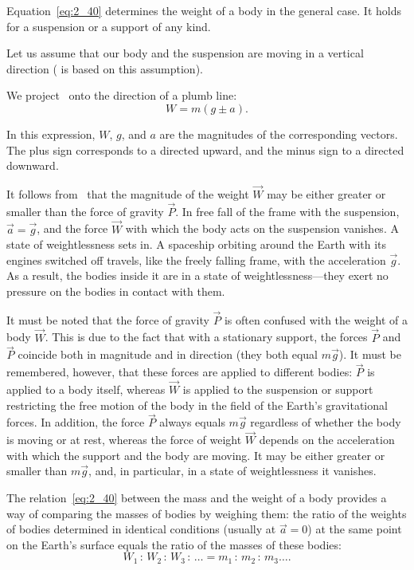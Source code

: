 \noindent
Equation~\eqref{eq:2_40} determines the weight of a body in the general case. It holds for a suspension or a support of any kind.

Let us assume that our body and the suspension are moving in a vertical direction ( is based on this assumption).

We project~ onto the direction of a plumb line:
\begin{equation}\label{eq:2_41}
W = m(g \pm a).
\end{equation}

\noindent
In this expression, $W$, $g$, and $a$ are the magnitudes of the corresponding vectors. The plus sign corresponds to a directed upward, and the minus sign to a directed downward.

It follows from~ that the magnitude of the weight $\vec{W}$ may be either greater or smaller than the force of gravity $\vec{P}$. In free fall of the frame with the suspension, $\vec{a}=\vec{g}$, and the force $\vec{W}$ with which the body acts on the suspension vanishes. A state of weightlessness sets in. A spaceship orbiting around the Earth with its engines switched off travels, like the freely falling frame, with the acceleration $\vec{g}$. As a result, the bodies inside it are in a state of weightlessness---they exert no pressure on the bodies in contact with them.

It must be noted that the force of gravity $\vec{P}$ is often confused with the weight of a body $\vec{W}$. This is due to the fact that with a stationary support, the forces $\vec{P}$ and $\vec{P}$ coincide both in magnitude and in direction (they both equal $m\vec{g}$). It must be remembered, however, that these forces are applied to different bodies: $\vec{P}$ is applied to a body itself, whereas $\vec{W}$ is applied to the suspension or support restricting the free motion of the body in the field of the Earth's gravitational forces. In addition, the force $\vec{P}$ always equals $m\vec{g}$ regardless of whether the body is moving or at rest, whereas the force of weight $\vec{W}$ depends on the acceleration with which the support and the body are moving. It may be either greater or smaller than $m\vec{g}$, and, in particular, in a state of weightlessness it vanishes.

The relation~\eqref{eq:2_40} between the mass and the weight of a body provides a way of comparing the masses of bodies by weighing them: the ratio of the weights of bodies determined in identical conditions (usually at $\vec{a}=0$) at the same point on the Earth's surface equals the ratio of the masses of these bodies:
\begin{equation*}
W_1\,:\,W_2\,:\,W_3\,:\,\ldots = m_1\,:\,m_2\,:\,m_3\ldots.
\end{equation*}


